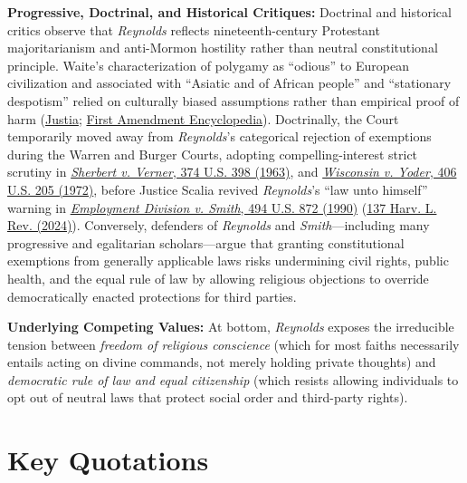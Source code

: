 \documentclass[12pt]{article}
\begin{document}
\textbf{Progressive, Doctrinal, and Historical Critiques:} Doctrinal and historical critics observe that \textit{Reynolds} reflects nineteenth-century Protestant majoritarianism and anti-Mormon hostility rather than neutral constitutional principle. Waite's characterization of polygamy as ``odious'' to European civilization and associated with ``Asiatic and of African people'' and ``stationary despotism'' relied on culturally biased assumptions rather than empirical proof of harm (\href{https://supreme.justia.com/cases/federal/us/98/145/}{Justia}; \href{https://firstamendment.mtsu.edu/article/reynolds-v-united-states/}{First Amendment Encyclopedia}). Doctrinally, the Court temporarily moved away from \textit{Reynolds}'s categorical rejection of exemptions during the Warren and Burger Courts, adopting compelling-interest strict scrutiny in \href{https://supreme.justia.com/cases/federal/us/374/398/}{\textit{Sherbert v. Verner}, 374 U.S. 398 (1963)}, and \href{https://supreme.justia.com/cases/federal/us/406/205/}{\textit{Wisconsin v. Yoder}, 406 U.S. 205 (1972)}, before Justice Scalia revived \textit{Reynolds}'s ``law unto himself'' warning in \href{https://supreme.justia.com/cases/federal/us/494/872/}{\textit{Employment Division v. Smith}, 494 U.S. 872 (1990)} (\href{https://harvardlawreview.org/print/vol-137/a-law-unto-himselfemp-div-v-smith-494-u-s-872-879-1990-quoting-reynolds-v-united-states-98-u-s-145-167-1879-free-exercise-unequal-value-and-the-future-of-public/}{137 Harv. L. Rev. (2024)}). Conversely, defenders of \textit{Reynolds} and \textit{Smith}---including many progressive and egalitarian scholars---argue that granting constitutional exemptions from generally applicable laws risks undermining civil rights, public health, and the equal rule of law by allowing religious objections to override democratically enacted protections for third parties.

\textbf{Underlying Competing Values:} At bottom, \textit{Reynolds} exposes the irreducible tension between \textit{freedom of religious conscience} (which for most faiths necessarily entails acting on divine commands, not merely holding private thoughts) and \textit{democratic rule of law and equal citizenship} (which resists allowing individuals to opt out of neutral laws that protect social order and third-party rights).

\section{Key Quotations}
\end{document}
